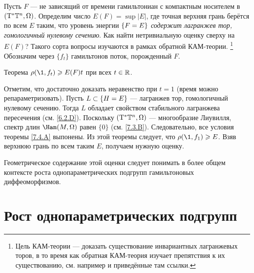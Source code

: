Пусть $F$ --- не зависящий от времени гамильтониан с компактным
носителем в $(\mathrm{T}^\ast \mathbb{T}^n, \Omega)$. 
Определим число $E(F)=\sup|E|$, где точная верхняя грань берётся
по всем $E$ таким, что уровень энергии $\{F \z= E\}$ \textit{содержит
лагранжев тор, гомологичный нулевому сечению}. 
Как найти нетривиальную оценку сверху на $E (F)$?
Такого сорта вопросы изучаются в рамках обратной КАМ-теории.%
\footnote{Цель КАМ-теории --- доказать существование инвариантных
  лагранжевых торов, в то время как обратная КАМ-теория изучает
  препятствия к их существованию, см. например \cite{Mac} и
  приведённые там ссылки.} 
Обозначим через $\{f_t\}$ гамильтонов поток, порожденный $F$.

\begin{thm}[(ср. \cite{BP2,P8})
]{Теорема}\label{8.1.C}
  $\rho (\1, f_t) \ge E (F) t$ при всех $t \z\in \RR$.
\end{thm}

Отметим, что достаточно доказать неравенство при $t = 1$ (время можно
репараметризовать).  
Пусть $L \z\subset \{H = E\}$ --- лагранжев тор, гомологичный нулевому сечению.
Тогда $L$ обладает свойством стабильного лагранжева пересечения
(см. \ref{6.2.D}). 
Поскольку $(\mathrm{T}^\ast \mathbb{T}^n, \Omega)$ --- многообразие Лиувилля, спектр
длин $\Ham (M, \Omega)$ равен $\{0\}$ (см. \ref{7.3.B}). 
Следовательно, все условия теоремы \ref{7.4.A} выпонены. 
Из этой теоремы следует, что $\rho (\1, f_1) \ge E$. 
Взяв верхнюю грань по всем таким $E$, получаем нужную оценку.
\qeds

Геометрическое содержание этой оценки следует понимать в более общем
контексте роста однопараметрических подгрупп гамильтоновых
диффеоморфизмов. 


\section{Рост однопараметрических подгрупп}\label{sec:8.2}

